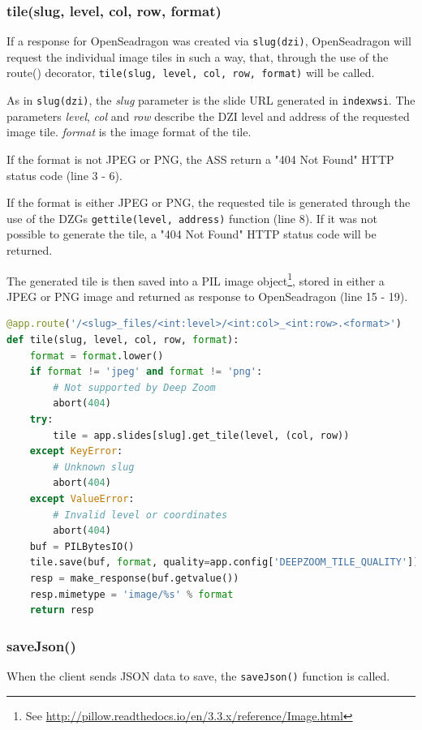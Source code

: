 \subsubsection{tile(slug, level, col, row, format)}
If a response for OpenSeadragon was created via \texttt{slug(dzi)}, OpenSeadragon will request the individual image tiles in such a way, that, through the use of the route() decorator, \texttt{tile(slug, level, col, row, format)} will be called.

As in \texttt{slug(dzi)}, the \emph{slug} parameter is the slide URL generated in \texttt{index{\textunderscore}wsi}. The parameters \emph{level}, \emph{col} and \emph{row} describe the DZI level and address of the requested image tile. \emph{format} is the image format of the tile.

If the format is not JPEG or PNG, the ASS return a "404 Not Found" HTTP status code (line 3 - 6).

If the format is either JPEG or PNG, the requested tile is generated through the use of the DZGs \texttt{get{\textunderscore}tile(level, address)} function (line 8). If it was not possible to generate the tile, a "404 Not Found" HTTP status code will be returned.

The generated tile is then saved into a PIL image object\footnote{See \url{http://pillow.readthedocs.io/en/3.3.x/reference/Image.html}}, stored in either a JPEG or PNG image and returned as response to OpenSeadragon (line 15 - 19).

\begin{lstlisting}[language=Python, frame=single]
@app.route('/<slug>_files/<int:level>/<int:col>_<int:row>.<format>')
def tile(slug, level, col, row, format):
	format = format.lower()
	if format != 'jpeg' and format != 'png':
		# Not supported by Deep Zoom
		abort(404)
	try:
		tile = app.slides[slug].get_tile(level, (col, row))
	except KeyError:
		# Unknown slug
		abort(404)
	except ValueError:
		# Invalid level or coordinates
		abort(404)
	buf = PILBytesIO()
	tile.save(buf, format, quality=app.config['DEEPZOOM_TILE_QUALITY'])
	resp = make_response(buf.getvalue())
	resp.mimetype = 'image/%s' % format
	return resp
\end{lstlisting}


\subsubsection{saveJson()}
When the client sends JSON data to save, the \texttt{saveJson()} function is called.


